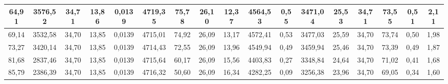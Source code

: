 \begin{table}[H]
{\begin{tabular}{|c|c|c|c|c|c|c|c|c|c|c|c|c|c|c|c|c|}
64,91                     & 3576,52           & 34,71          & 13,86             & 0,0139            & 4719,35           & 75,78                & 26,10             & 12,37            & 4564,53          & 0,55           & 3471,04            & 25,53          & 34,71            & 73,55                  & 0,51               & 2,11          \\ \hline
69,14                     & 3532,58           & 34,70          & 13,85             & 0,0139            & 4715,01           & 74,92                & 26,09             & 13,17            & 4572,41          & 0,53           & 3477,03            & 25,59          & 34,70            & 73,74                  & 0,50               & 1,98          \\ \hline
73,27                     & 3420,14           & 34,70          & 13,85             & 0,0139            & 4714,43           & 72,55                & 26,09             & 13,96            & 4549,94          & 0,49           & 3459,94            & 25,46          & 34,70            & 73,39                  & 0,49               & 1,87          \\ \hline
81,68                     & 2837,46           & 34,70          & 13,85             & 0,0139            & 4715,64           & 60,17                & 26,09             & 15,56            & 4403,83          & 0,27           & 3348,84            & 24,64          & 34,70            & 71,02                  & 0,41               & 1,68          \\ \hline
85,79                     & 2386,39           & 34,70          & 13,85             & 0,0139            & 4716,32           & 50,60                & 26,09             & 16,34            & 4282,25          & 0,09           & 3256,38            & 23,96          & 34,70            & 69,05                  & 0,34               & 1,60          \\ \hline
\end{tabular}
}
\end{table}	
